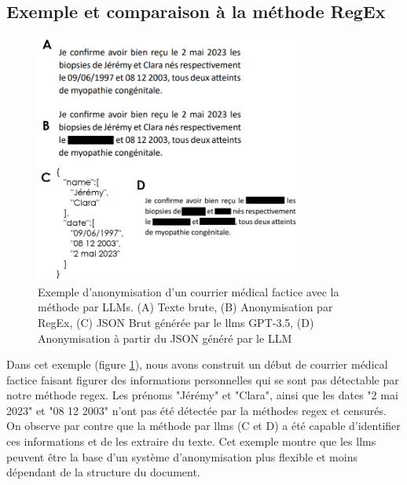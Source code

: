 \subsection{Exemple et comparaison à la méthode RegEx}
\begin{figure}[htbp]
  \centering
  \includegraphics[width=0.8\textwidth]{figures/llms_anonym.png}
  \caption[Exemple anonymisation LLMs]{Exemple d'anonymisation d'un courrier médical factice avec la méthode par LLMs. (A) Texte brute, (B) Anonymisation par RegEx, (C) JSON Brut générée par le \gls{llms} GPT-3.5, (D) Anonymisation à partir du JSON généré par le LLM}
  \label{fig:llms_anonym}
\end{figure}
Dans cet exemple (figure \ref{fig:llms_anonym}), nous avons construit un début de courrier médical factice faisant figurer des informations personnelles qui se sont pas détectable par notre méthode \gls{regex}. Les prénoms "Jérémy" et "Clara", ainsi que les dates "2 mai 2023" et "08 12 2003" n'ont pas été détectée par la méthodes \gls{regex} et censurés. On observe par contre que la méthode par \gls{llms} (C et D) a été capable d'identifier ces informations et de les extraire du texte. Cet exemple montre que les \gls{llms} peuvent être la base d'un système d'anonymisation plus flexible et moins dépendant de la structure du document.

